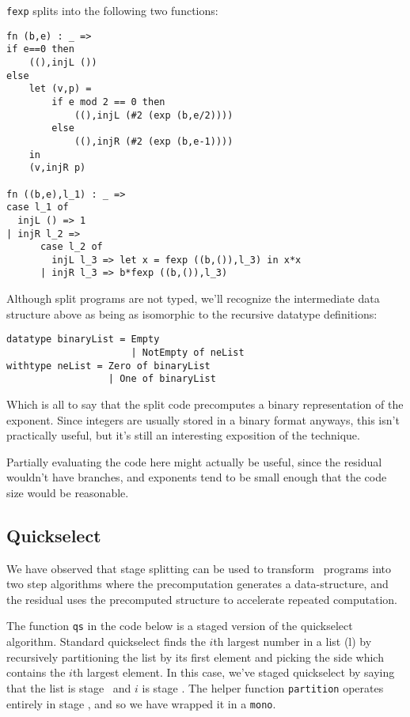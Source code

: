 \noindent
{\tt fexp} splits into the following two functions:


\begin{lstlisting} 
fn (b,e) : _ =>
if e==0 then
    ((),injL ())
else
    let (v,p) =
        if e mod 2 == 0 then
            ((),injL (#2 (exp (b,e/2))))
        else
            ((),injR (#2 (exp (b,e-1))))
    in
    (v,injR p)

fn ((b,e),l_1) : _ =>
case l_1 of
  injL () => 1
| injR l_2 =>
      case l_2 of
        injL l_3 => let x = fexp ((b,()),l_3) in x*x
      | injR l_3 => b*fexp ((b,()),l_3)
\end{lstlisting}

Although split programs are not typed, we'll recognize the intermediate data structure 
above as being as isomorphic to the recursive datatype definitions:
\begin{lstlisting} 
datatype binaryList = Empty 
                      | NotEmpty of neList
withtype neList = Zero of binaryList 
                  | One of binaryList
\end{lstlisting}
Which is all to say that the split code precomputes a binary representation of the exponent.
Since integers are usually stored in a binary format anyways, this isn't practically useful,
but it's still an interesting exposition of the technique.

Partially evaluating the code here might actually be useful, since the residual wouldn't have branches,
and exponents tend to be small enough that the code size would be reasonable.

\subsection{Quickselect}


We have observed that stage splitting can be used to transform \lang\ programs into two step algorithms where the precomputation generates a data-structure, and the residual uses the precomputed structure to accelerate repeated computation.  

The function {\tt qs} in the code below is a staged version of the quickselect algorithm.
Standard quickselect finds the $i$th largest number in a list (l) by recursively partitioning the list by its 
first element and picking the side which contains the $i$th largest element.
In this case, we've staged quickselect by saying that the list is stage \bbone\ and $i$ is stage \bbtwo.
The helper function {\tt partition} operates entirely in stage \bbone, and so we have wrapped it in a \texttt{mono}.

